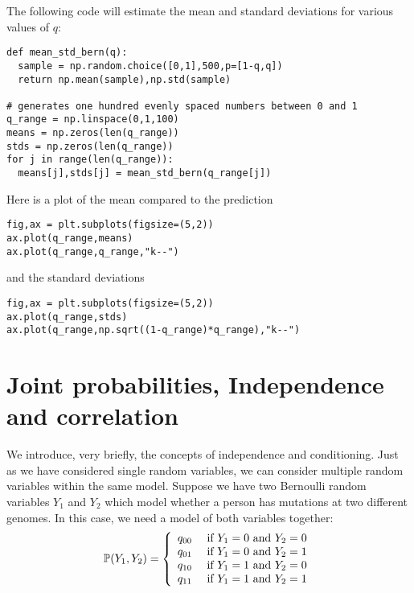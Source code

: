 \begin{solution}
The following code will estimate the mean and standard deviations for various values of $q$: 
\begin{Verbatim}
def mean_std_bern(q):
  sample = np.random.choice([0,1],500,p=[1-q,q])
  return np.mean(sample),np.std(sample)

# generates one hundred evenly spaced numbers between 0 and 1
q_range = np.linspace(0,1,100) 
means = np.zeros(len(q_range))
stds = np.zeros(len(q_range))
for j in range(len(q_range)):
  means[j],stds[j] = mean_std_bern(q_range[j])
\end{Verbatim}
Here is a plot of the mean compared to the prediction 
\begin{Verbatim}
fig,ax = plt.subplots(figsize=(5,2))
ax.plot(q_range,means)
ax.plot(q_range,q_range,"k--")
\end{Verbatim}
and the standard deviations
\begin{Verbatim}
fig,ax = plt.subplots(figsize=(5,2))
ax.plot(q_range,stds)
ax.plot(q_range,np.sqrt((1-q_range)*q_range),"k--")
\end{Verbatim}

\end{solution}










\section{Joint probabilities, Independence and correlation} We introduce, very briefly, the concepts of independence and conditioning. Just as we have considered single random variables, we can consider multiple random variables within the same model. Suppose we have two Bernoulli random variables $Y_1$ and $Y_2$ which model whether a person has mutations at two different genomes.  In this case, we need a model of both variables together: 
\begin{equation}
\mathbb P(Y_1,Y_2) = \left\{ \begin{array}{cc}
q_{00} & \text{ if }Y_1=0 \text{ and } Y_2 = 0\\
q_{01} & \text{ if }Y_1=0 \text{ and } Y_2 = 1\\
q_{10} & \text{ if }Y_1=1 \text{ and } Y_2 = 0\\
q_{11} & \text{ if }Y_1=1 \text{ and } Y_2 = 1\\
\end{array}
 \right. 
\end{equation}


